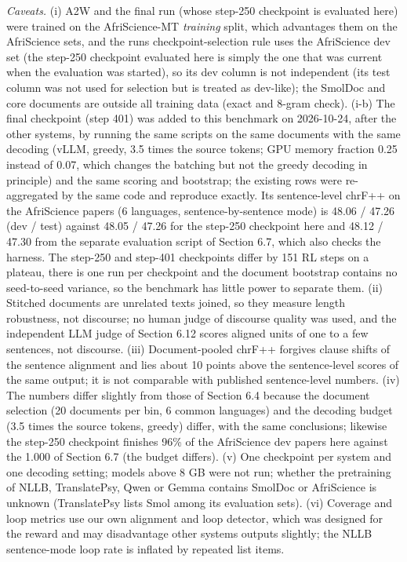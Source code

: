 \emph{Caveats.} (i) A2W and the final run (whose step-250 checkpoint is evaluated here) were trained on the AfriScience-MT \emph{training} split, which advantages them on the AfriScience sets, and the run\textquotesingle s checkpoint-selection rule uses the AfriScience dev set (the step-250 checkpoint evaluated here is simply the one that was current when the evaluation was started), so its dev column is not independent (its test column was not used for selection but is treated as dev-like); the SmolDoc and core documents are outside all training data (exact and 8-gram check). (i-b) The final checkpoint (step 401) was added to this benchmark on 2026-10-24, after the other systems, by running the same scripts on the same documents with the same decoding (vLLM, greedy, 3.5 times the source tokens; GPU memory fraction 0.25 instead of 0.07, which changes the batching but not the greedy decoding in principle) and the same scoring and bootstrap; the existing rows were re-aggregated by the same code and reproduce exactly. Its sentence-level chrF++ on the AfriScience papers (6 languages, sentence-by-sentence mode) is 48.06 / 47.26 (dev / test) against 48.05 / 47.26 for the step-250 checkpoint here and 48.12 / 47.30 from the separate evaluation script of Section 6.7, which also checks the harness. The step-250 and step-401 checkpoints differ by 151 RL steps on a plateau, there is one run per checkpoint and the document bootstrap contains no seed-to-seed variance, so the benchmark has little power to separate them. (ii) Stitched documents are unrelated texts joined, so they measure length robustness, not discourse; no human judge of discourse quality was used, and the independent LLM judge of Section 6.12 scores aligned units of one to a few sentences, not discourse. (iii) Document-pooled chrF++ forgives clause shifts of the sentence alignment and lies about 10 points above the sentence-level scores of the same output; it is not comparable with published sentence-level numbers. (iv) The numbers differ slightly from those of Section 6.4 because the document selection (20 documents per bin, 6 common languages) and the decoding budget (3.5 times the source tokens, greedy) differ, with the same conclusions; likewise the step-250 checkpoint finishes 96\% of the AfriScience dev papers here against the 1.000 of Section 6.7 (the budget differs). (v) One checkpoint per system and one decoding setting; models above 8 GB were not run; whether the pretraining of NLLB, TranslatePsy, Qwen or Gemma contains SmolDoc or AfriScience is unknown (TranslatePsy lists Smol among its evaluation sets). (vi) Coverage and loop metrics use our own alignment and loop detector, which was designed for the reward and may disadvantage other systems\textquotesingle{} outputs slightly; the NLLB sentence-mode loop rate is inflated by repeated list items.

